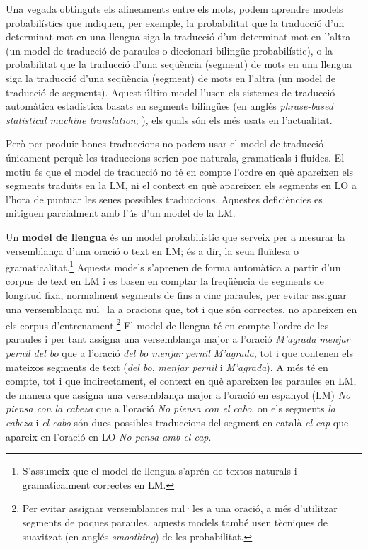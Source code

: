 Una vegada obtinguts els alineaments entre els mots, podem aprendre
models probabilístics que indiquen, per exemple, la probabilitat que
la traducció d'un determinat mot en una llengua siga la traducció d'un
determinat mot en l'altra (un model de traducció de paraules o
diccionari bilingüe probabilístic), o la probabilitat que la traducció
d'una seqüència (segment) de mots en una llengua siga la traducció
d'una seqüència (segment) de mots en l'altra (un model de traducció de
segments). Aquest últim model l'usen els sistemes de traducció
automàtica estadística basats en segments bilingües (en anglés
\emph{phrase-based statistical machine translation}; \cite{koehnbook}),
els quals són els més usats en l'actualitat.

Però per produir bones traduccions no podem usar el model de traducció
únicament perquè les traduccions serien poc naturals, gramaticals i
fluides. El motiu és que el model de traducció no té en compte l'ordre
en què apareixen els segments traduïts en la LM, ni el context en què
apareixen els segments en LO a l'hora de puntuar les seues possibles
traduccions. Aquestes deficiències es mitiguen parcialment amb l'ús
d'un model de la LM.

Un \textbf{model de llengua} és un model probabilístic que serveix per
a mesurar la versemblança d'una oració o text en LM; és a dir, la seua
fluïdesa o gramaticalitat.\footnote{S'assumeix que el model de llengua
  s'aprén de textos naturals i gramaticalment correctes en LM.}
Aquests models s'aprenen de forma automàtica a partir d'un corpus de
text en LM i es basen en comptar la freqüència de segments de longitud
fixa, normalment segments de fins a cinc paraules, per evitar assignar
una versemblança nul·la a oracions que, tot i que són correctes, no
apareixen en els corpus d'entrenament.\footnote{Per evitar assignar
  versemblances nul·les a una oració, a més d'utilitzar segments de
  poques paraules, aquests models també usen tècniques de suavitzat
  (en anglés \emph{smoothing}) de les probabilitat.} El model de
llengua té en compte l'ordre de les paraules i per tant assigna una
versemblança major a l'oració \emph{M'agrada menjar pernil del bo} que
a l'oració \emph{del bo menjar pernil M'agrada}, tot i que contenen
els mateixos segments de text (\emph{del bo}, \emph{menjar pernil} i
\emph{M'agrada}). A més té en compte, tot i que indirectament, el
context en què apareixen les paraules en LM, de manera que assigna
una versemblança major a l'oració en espanyol (LM) \emph{No piensa con
  la cabeza} que a l'oració \emph{No piensa con el cabo}, on els
segments \emph{la cabeza} i \emph{el cabo} són dues possibles
traduccions del segment en català \emph{el cap} que apareix en
l'oració en LO \emph{No pensa amb el cap}.


